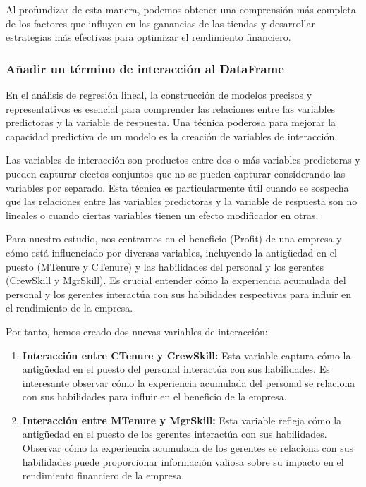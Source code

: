 \documentclass[
]{article}
\begin{document}
Al profundizar de esta manera, podemos obtener una comprensión más
completa de los factores que influyen en las ganancias de las tiendas y
desarrollar estrategias más efectivas para optimizar el rendimiento
financiero.

\hypertarget{auxf1adir-un-tuxe9rmino-de-interacciuxf3n-al-dataframe}{%
\subsubsection{Añadir un término de interacción al
DataFrame}\label{auxf1adir-un-tuxe9rmino-de-interacciuxf3n-al-dataframe}}

En el análisis de regresión lineal, la construcción de modelos precisos
y representativos es esencial para comprender las relaciones entre las
variables predictoras y la variable de respuesta. Una técnica poderosa
para mejorar la capacidad predictiva de un modelo es la creación de
variables de interacción.

Las variables de interacción son productos entre dos o más variables
predictoras y pueden capturar efectos conjuntos que no se pueden
capturar considerando las variables por separado. Esta técnica es
particularmente útil cuando se sospecha que las relaciones entre las
variables predictoras y la variable de respuesta son no lineales o
cuando ciertas variables tienen un efecto modificador en otras.

Para nuestro estudio, nos centramos en el beneficio (Profit) de una
empresa y cómo está influenciado por diversas variables, incluyendo la
antigüedad en el puesto (MTenure y CTenure) y las habilidades del
personal y los gerentes (CrewSkill y MgrSkill). Es crucial entender cómo
la experiencia acumulada del personal y los gerentes interactúa con sus
habilidades respectivas para influir en el rendimiento de la empresa.

Por tanto, hemos creado dos nuevas variables de interacción:

\begin{enumerate}
\def\labelenumi{\arabic{enumi}.}
\item
  \textbf{Interacción entre CTenure y CrewSkill:} Esta variable captura
  cómo la antigüedad en el puesto del personal interactúa con sus
  habilidades. Es interesante observar cómo la experiencia acumulada del
  personal se relaciona con sus habilidades para influir en el beneficio
  de la empresa.
\item
  \textbf{Interacción entre MTenure y MgrSkill:} Esta variable refleja
  cómo la antigüedad en el puesto de los gerentes interactúa con sus
  habilidades. Observar cómo la experiencia acumulada de los gerentes se
  relaciona con sus habilidades puede proporcionar información valiosa
  sobre su impacto en el rendimiento financiero de la empresa.
\end{enumerate}
\end{document}
